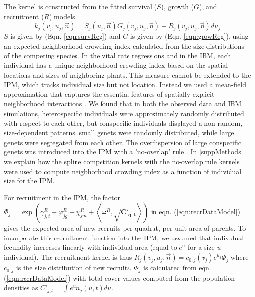 \documentclass[11pt]{article}
\begin{document}
\begin{doublespacing}
The kernel is constructed from the fitted survival ($S$), growth ($G$), and recruitment ($R$) models, 
\begin{equation}
k_j(v_j,u_j,\vec{n})=S_j(u_j,\vec{n})G_j(v_j,u_j,\vec{n})+R_j(v_j,u_j,\vec{n}) du_j
\label{eqn:IPM} 
\end{equation}
$S$ is given by (Eqn. \ref{eqn:survReg}) and $G$ is given by (Eqn. \ref{eqn:growReg}), using an expected neighborhood crowding
index calculated from the size distributions of the competing species. In the vital rate regressions and in the IBM, each 
individual has a unique neighborhood crowding index based on the spatial locations and sizes of neighboring plants. This 
measure cannot be extended to the IPM, which tracks individual size but not location. Instead we used a 
mean-field approximation that captures the essential features of spatially-explicit neighborhood interactions \citep{adler_coexistence_2010}. 
We found that in both the observed data and IBM simulations, heterospecific individuals were approximately randomly distributed with respect to each other, 
but conspecific individuals displayed a non-random, size-dependent patterns: small genets were randomly distributed, while large genets 
were segregated from each other. The overdispersion of large conspecific genets was introduced into the IPM 
with a 'no-overlap' rule \citep{adler_coexistence_2010}. In \ref{suppMethods} we explain how the spline competition kernels with the no-overlap rule kernels were used to compute neigbhorhood crowding index as a function of individual size for the IPM.  

For recruitment in the IPM, the factor $ \Phi_j  = \exp{\left(\gamma_{j,t}^R +  \varphi_{jg}^R + \chi_{jm}^R + 
\left \langle \boldsymbol{\omega}^R , \boldsymbol{\sqrt{C'_{q,t}}} \right \rangle \right) }$
in eqn. (\ref{eqn:recrDataModel}) gives the expected 
area of new recruits per quadrat, per unit area of parents. To incorporate this recruitment function into the IPM, we assumed that individual fecundity increases linearly with individual area (equal to $e^u$ for a size-$u$ individual). The recruitment kernel is thus
$R_j(v_j,u_j,\vec{n})=c_{0,j}(v_j)e^{u_j}\Phi_j$ \citep{adler_coexistence_2010} where $c_{0,j}$ is the
size distribution of new recruits. $\Phi_j$ is calculated from eqn. (\ref{eqn:recrDataModel}) with total cover values computed from the population densities as $C'_{j,t} = \int e^u n_j(u,t) du$. 


\end{doublespacing}
\end{document}
